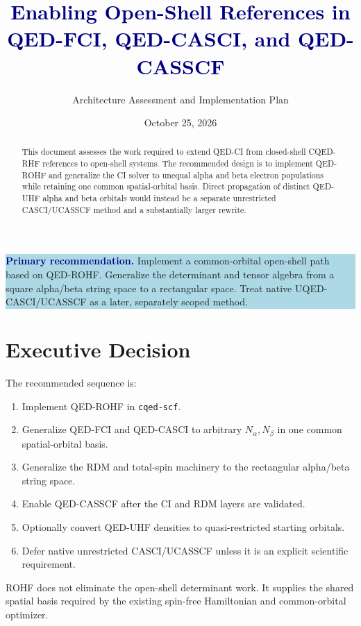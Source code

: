 \documentclass[11pt]{article}
\title{\vspace{-1cm}\textbf{\textcolor{navy}{Enabling Open-Shell References in\\QED-FCI, QED-CASCI, and QED-CASSCF}}}
\author{Architecture Assessment and Implementation Plan}
\date{October 25, 2026}
\newcommand{\code}[1]{\texttt{\small #1}}
\begin{document}
\maketitle

\begin{abstract}
This document assesses the work required to extend QED-CI from closed-shell
CQED-RHF references to open-shell systems. The recommended design is to
implement QED-ROHF and generalize the CI solver to unequal alpha and beta
electron populations while retaining one common spatial-orbital basis. Direct
propagation of distinct QED-UHF alpha and beta orbitals would instead be a
separate unrestricted CASCI/UCASSCF method and a substantially larger rewrite.
\end{abstract}

\begin{center}
\colorbox{lightblue}{\parbox{0.91\textwidth}{
\textbf{\textcolor{navy}{Primary recommendation.}}
Implement a common-orbital open-shell path based on QED-ROHF. Generalize the
determinant and tensor algebra from a square alpha/beta string space to a
rectangular space. Treat native UQED-CASCI/UCASSCF as a later, separately
scoped method.}}
\end{center}

\tableofcontents
\newpage

\section{Executive Decision}

The recommended sequence is:
\begin{enumerate}
  \item Implement QED-ROHF in \code{cqed-scf}.
  \item Generalize QED-FCI and QED-CASCI to arbitrary \(N_\alpha,N_\beta\)
  in one common spatial-orbital basis.
  \item Generalize the RDM and total-spin machinery to the rectangular
  alpha/beta string space.
  \item Enable QED-CASSCF after the CI and RDM layers are validated.
  \item Optionally convert QED-UHF densities to quasi-restricted starting
  orbitals.
  \item Defer native unrestricted CASCI/UCASSCF unless it is an explicit
  scientific requirement.
\end{enumerate}

ROHF does not eliminate the open-shell determinant work. It supplies the
shared spatial basis required by the existing spin-free Hamiltonian and
common-orbital optimizer.
\end{document}
